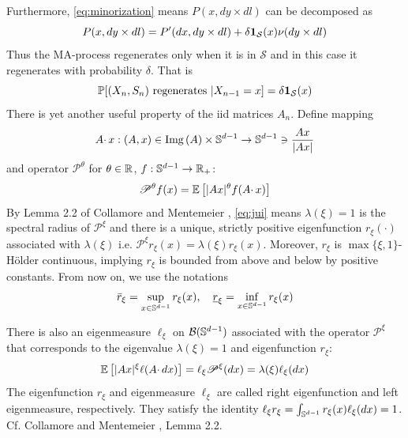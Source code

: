 Furthermore, \eqref{eq:minorization} means
$P(x, dy \times dl)$ can be decomposed as
\[
P(x, dy \times dl) = P'(dx, dy \times dl)
+
\delta \mathbf{1}_{\mathcal S}(x) \nu(dy \times dl)
\]
Thus the MA-process regenerates only when it is in $\mathcal S$ and in
this case it regenerates with probability $\delta$. That is
\[
\mathbb{P}[(X_n, S_n) \text{ regenerates } | X_{n-1} = x] = \delta \mathbf{1}_{\mathcal S}(x)
\]
There is yet another useful property of the iid matrices $A_n$. Define
mapping
\[
A \cdotp x: (A, x) \in \text{Img}\,(A) \times \mathbb S^{d-1} \to
\mathbb S^{d-1} \ni {
  A x \over |A x|
}
\]
and operator $\mathscr P^\theta$ for $\theta \in \mathbb R$,
$f: \mathbb S^{d-1} \to \mathbb R_+$:
\begin{equation}
  \label{eq:trhyh}
  \mathscr P^\theta f(x) =
  \mathbb{E} \left[
    |A x|^\theta f(A \cdotp x)
    \right]
\end{equation}
By Lemma 2.2 of Collamore and Mentemeier
\cite{collamore:mentemeier:2016}, \eqref{eq:jui} means
$\lambda(\xi) = 1$ is the spectral radius of $\mathscr P^\xi$ and
there is a unique, strictly positive eigenfunction $r_\xi(\cdot)$
associated with $\lambda(\xi)$ i.e.
$\mathscr P^\xi r_\xi(x) = \lambda(\xi) r_\xi(x)$.
Moreover, $r_\xi$ is $\max\{\xi, 1\}$-H\"older continuous, implying
$r_\xi$ is bounded from above and below by positive constants. From
now on, we use the notations
\[
\bar r_\xi = \sup_{x \in \mathbb S^{d-1}} r_\xi(x),\quad
\underline r_\xi = \inf_{x \in \mathbb S^{d-1}} r_\xi(x)
\]

There is also an eigenmeasure $\ell_\xi$ on $\mathcal B(\mathbb S^{d-1})$
associated with the operator $\mathscr P^\xi$ that corresponds to the
eigenvalue $\lambda(\xi) = 1$ and eigenfunction $r_\xi$:
\begin{equation}
  \label{eq:eigenmeasure}
  \mathbb{E} \left[ |A x|^\xi \ell(A \cdotp dx) \right]
  = \ell_\xi \mathscr P^\xi (dx)
  = \lambda(\xi) \ell_\xi(dx)
\end{equation}
The eigenfunction $r_\xi$ and eigenmeasure $\ell_\xi$ are called
right eigenfunction and left eigenmeasure, respectively. They
satisfy the identity
$\ell_\xi r_\xi = \int_{\mathbb S^{d-1}} r_\xi(x) \ell_\xi(dx) = 1$.
Cf. Collamore and Mentemeier \cite{collamore:mentemeier:2016},
Lemma 2.2.

